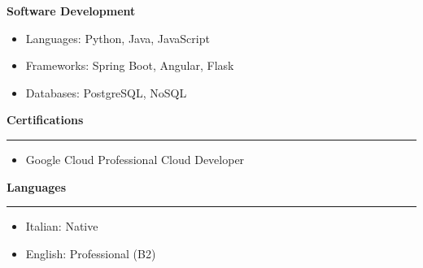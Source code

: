 \documentclass[9pt, a4paper]{article}
\newcommand{\cvsection}[1]{%
	\vspace{8pt}\par
	{\Large\bfseries\color{sectionblue}#1}\par
	\vspace{2pt}\hrule\vspace{6pt}
}
\begin{document}
\begin{minipage}[t]{0.27\linewidth}
		{\bfseries Software Development}
		\begin{itemize}[leftmargin=*, nosep, itemsep=2pt]
			\item Languages: Python, Java, JavaScript
			\item Frameworks: Spring Boot, Angular, Flask
			\item Databases: PostgreSQL, NoSQL
		\end{itemize}
		
		\cvsection{Certifications}
		\begin{itemize}[leftmargin=*, nosep, itemsep=2pt]
			\item Google Cloud Professional Cloud Developer
		\end{itemize}
		
		\cvsection{Languages}
		\begin{itemize}[leftmargin=*, nosep, itemsep=2pt]
			\item Italian: Native
			\item English: Professional (B2)
		\end{itemize}
		
	\end{minipage}
	
\end{document}
